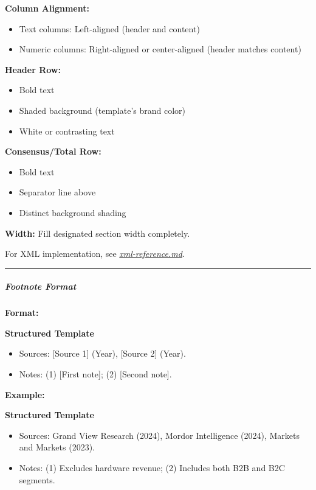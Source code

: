 \documentclass[11pt]{article}
\begin{document}
\textbf{Column Alignment:}

\begin{itemize}[leftmargin=*,itemsep=2pt,topsep=2pt]
\item {} Text columns: Left-aligned (header and content)
\item {} Numeric columns: Right-aligned or center-aligned (header matches content)
\end{itemize}

\textbf{Header Row:}

\begin{itemize}[leftmargin=*,itemsep=2pt,topsep=2pt]
\item {} Bold text
\item {} Shaded background (template's brand color)
\item {} White or contrasting text
\end{itemize}

\textbf{Consensus/Total Row:}

\begin{itemize}[leftmargin=*,itemsep=2pt,topsep=2pt]
\item {} Bold text
\item {} Separator line above
\item {} Distinct background shading
\end{itemize}

\textbf{Width:} Fill designated section width completely.


For XML implementation, see \href{reference/xml-reference.md\#table-implementation}{\emph{xml-reference.md}}.


\vspace{0.5em}\hrule\vspace{0.5em}

\subparagraph{Footnote Format}\mbox{}\par

\textbf{Format:}

\textbf{Structured Template}
\begin{itemize}[leftmargin=*,itemsep=2pt,topsep=2pt]
\item {} Sources: [Source 1] (Year), [Source 2] (Year).
\item {} Notes: (1) [First note]; (2) [Second note].
\end{itemize}

\textbf{Example:}

\textbf{Structured Template}
\begin{itemize}[leftmargin=*,itemsep=2pt,topsep=2pt]
\item {} Sources: Grand View Research (2024), Mordor Intelligence (2024), Markets and Markets (2023).
\item {} Notes: (1) Excludes hardware revenue; (2) Includes both B2B and B2C segments.
\end{itemize}
\end{document}
